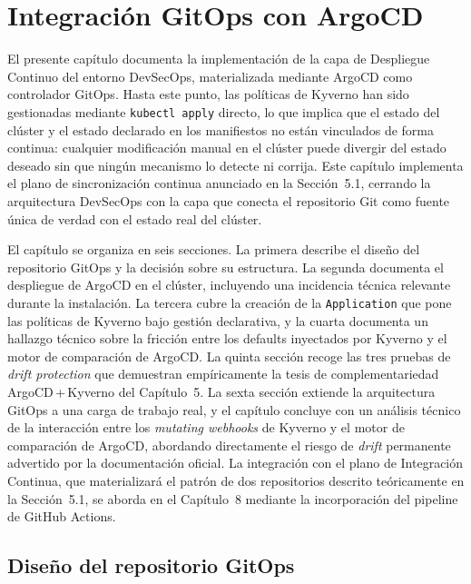 \chapter{Integración GitOps con ArgoCD}

El presente capítulo documenta la implementación de la capa de Despliegue Continuo del entorno DevSecOps, materializada mediante ArgoCD como controlador GitOps. Hasta este punto, las políticas de Kyverno han sido gestionadas mediante \texttt{kubectl apply} directo, lo que implica que el estado del clúster y el estado declarado en los manifiestos no están vinculados de forma continua: cualquier modificación manual en el clúster puede divergir del estado deseado sin que ningún mecanismo lo detecte ni corrija. Este capítulo implementa el plano de sincronización continua anunciado en la Sección~5.1, cerrando la arquitectura DevSecOps con la capa que conecta el repositorio Git como fuente única de verdad con el estado real del clúster.

El capítulo se organiza en seis secciones. La primera describe el diseño del repositorio GitOps y la decisión sobre su estructura. La segunda documenta el despliegue de ArgoCD en el clúster, incluyendo una incidencia técnica relevante durante la instalación. La tercera cubre la creación de la \texttt{Application} que pone las políticas de Kyverno bajo gestión declarativa, y la cuarta documenta un hallazgo técnico sobre la fricción entre los defaults inyectados por Kyverno y el motor de comparación de ArgoCD. La quinta sección recoge las tres pruebas de \textit{drift protection} que demuestran empíricamente la tesis de complementariedad ArgoCD\,+\,Kyverno del Capítulo~5. La sexta sección extiende la arquitectura GitOps a una carga de trabajo real, y el capítulo concluye con un análisis técnico de la interacción entre los \textit{mutating webhooks} de Kyverno y el motor de comparación de ArgoCD, abordando directamente el riesgo de \textit{drift} permanente advertido por la documentación oficial. La integración con el plano de Integración Continua, que materializará el patrón de dos repositorios descrito teóricamente en la Sección~5.1, se aborda en el Capítulo~8 mediante la incorporación del pipeline de GitHub Actions.

\section{Diseño del repositorio GitOps}

